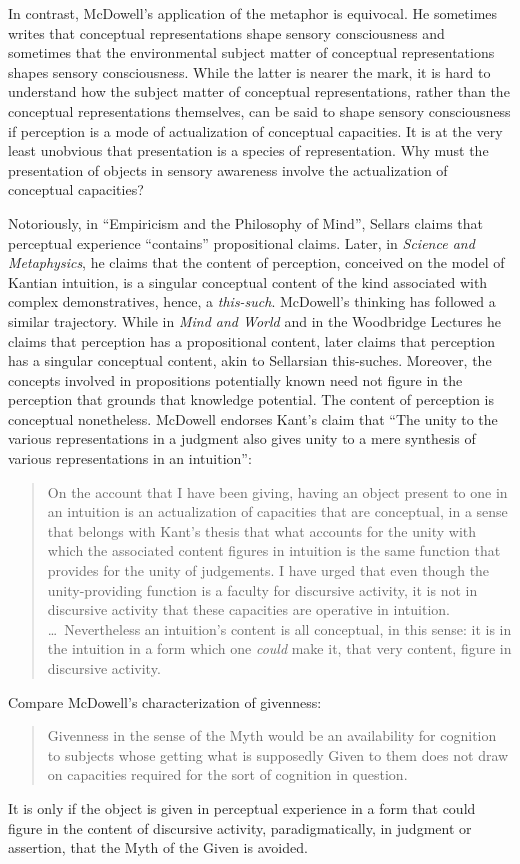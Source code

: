 \documentclass[12pt]{article}
\begin{document}
In contrast, McDowell's application of the metaphor is equivocal. He sometimes writes that conceptual representations shape sensory consciousness and sometimes that the environmental subject matter of conceptual representations shapes sensory consciousness. While the latter is nearer the mark, it is hard to understand how the subject matter of conceptual representations, rather than the conceptual representations themselves, can be said to shape sensory consciousness if perception is a mode of actualization of conceptual capacities. It is at the very least unobvious that presentation is a species of representation. Why must the presentation of objects in sensory awareness involve the actualization of conceptual capacities?

Notoriously, in ``Empiricism and the Philosophy of Mind'', Sellars claims that perceptual experience ``contains'' propositional claims. Later, in \emph{Science and Metaphysics}, he claims that the content of perception, conceived on the model of Kantian intuition, is a singular conceptual content of the kind associated with complex demonstratives, hence, a \emph{this-such}. McDowell's thinking has followed a similar trajectory. While in \emph{Mind and World} and in the Woodbridge Lectures he claims that perception has a propositional content, later \citet[]{McDowell:2008fk} claims that perception has a singular conceptual content, akin to Sellarsian this-suches. Moreover, the concepts involved in propositions potentially known need not figure in the perception that grounds that knowledge potential. The content of perception is conceptual nonetheless. McDowell endorses Kant's \citeyearpar[A79/B104--5]{Kant:1781fk} claim that ``The unity to the various representations in a judgment also gives unity to a mere synthesis of various representations in an intuition'':
\begin{quote}
	On the account that I have been giving, having an object present to one in an intuition is an actualization of capacities that are conceptual, in a sense that belongs with Kant's thesis that what accounts for the unity with which the associated content figures in intuition is the same function that provides for the unity of judgements. I have urged that even though the unity-providing function is a faculty for discursive activity, it is not in discursive activity that these capacities are operative in intuition. \ldots\ Nevertheless an intuition's content is all conceptual, in this sense: it is in the intuition in a form which one \emph{could} make it, that very content, figure in discursive activity. \citep[265]{McDowell:2008fk}
\end{quote}
Compare McDowell's characterization of givenness:
\begin{quote}
	Givenness in the sense of the Myth would be an availability for cognition to subjects whose getting what is supposedly Given to them does not draw on capacities required for the sort of cognition in question. \citep[256]{McDowell:2008fk}
\end{quote}
It is only if the object is given in perceptual experience in a form that could figure in the content of discursive activity, paradigmatically, in judgment or assertion, that the Myth of the Given is avoided.
\end{document}
